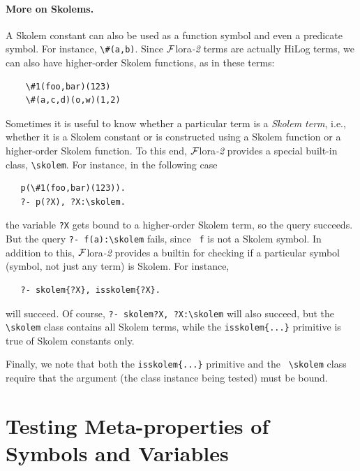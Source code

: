 \documentclass[11pt]{article}
\newcommand{\FLORA}{{\mbox{\sc ${\cal F}${lora}\rm\emph{-2}}}\xspace}
\newcommand{\FLSYSTEM}{\FLORA}
\newcommand{\bs}{\textbackslash}
\begin{document}
\paragraph{More on Skolems.}
A Skolem constant can also be used as a function symbol and even a
predicate symbol.
For instance,
{\tt \bs{}\#(a,b)}. Since \FLSYSTEM terms are actually HiLog terms, we can also
have higher-order Skolem functions, as in these terms:
\begin{verbatim}
    \#1(foo,bar)(123)
    \#(a,c,d)(o,w)(1,2)
\end{verbatim}
\index{\bs{}skolem class}
Sometimes it is useful to know whether a particular term
is a \emph{Skolem term}, i.e., whether it is a Skolem constant or is
constructed using a Skolem function or a higher-order Skolem function.
To this end, \FLSYSTEM provides a special built-in class, {\tt \bs{}skolem}. 
For instance, in the following case
\begin{verbatim}
   p(\#1(foo,bar)(123)).
   ?- p(?X), ?X:\skolem.
\end{verbatim}
the variable {\tt ?X} gets bound to a higher-order Skolem term, so 
the query succeeds. But the query {\tt ?- f(a):\bs{}skolem} fails, since {\tt
  f} is not a Skolem symbol.  
In addition to this, \FLSYSTEM provides a builtin for checking if a particular
symbol (symbol, not just any term) is Skolem. For instance,
\begin{verbatim}
   ?- skolem{?X}, isskolem{?X}.
\end{verbatim}
will succeed. Of course, {\tt ?- skolem{?X}, ?X:\bs{}skolem}   
will also succeed, but the {\tt \bs{}skolem} class contains all Skolem terms,
while the {\tt isskolem\{...\}} primitive is true of Skolem constants only.

Finally, we note that both the {\tt isskolem\{...\}} primitive and the {\tt
  \bs{}skolem} class require that the argument (the class
instance being tested) must be bound.


\section{Testing Meta-properties of Symbols and Variables}
\end{document}
